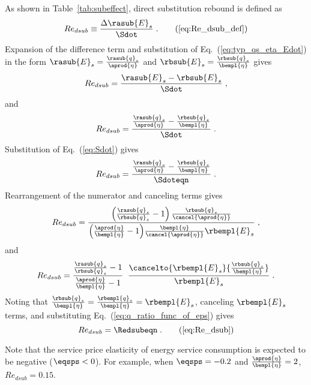 As shown in Table~\ref{tab:subeffect}, direct substitution rebound is defined as
%
\begin{equation}
  Re_{dsub} \equiv \frac{\Delta \rasub{E}_s}{\Sdot} \; . \tag{\ref{eq:Re_dsub_def}}
\end{equation}
%
Expansion of the difference term and
substitution of Eq.~(\ref{eq:typ_qs_eta_Edot}) in the form
$\rasub{E}_s = \frac{\rasub{q}_s}{\aprod{\eta}}$
and
$\rbsub{E}_s = \frac{\rbsub{q}_s}{\bempl{\eta}}$
gives
%
\begin{equation}
   Re_{dsub} = \frac{\rasub{E}_s - \rbsub{E}_s}{\Sdot} \; ,
\end{equation}
%
and
%
\begin{equation}
     Re_{dsub} = \frac{\frac{\rasub{q}_s}{\aprod{\eta}} - \frac{\rbsub{q}_s}{\bempl{\eta}}}{\Sdot} \; .
\end{equation}
%
Substitution of Eq.~(\ref{eq:Sdot}) gives
%
\begin{equation}
  Re_{dsub} = \frac{\frac{\rasub{q}_s}{\aprod{\eta}} - \frac{\rbsub{q}_s}{\bempl{\eta}}}
              {\Sdoteqn} \; .
\end{equation}
%
Rearrangement of the numerator and canceling terms gives
%
\begin{equation}
  Re_{dsub} = \frac{\left( \frac{\rasub{q}_s}{\rbsub{q}_s} - 1 \right) \frac{\rbsub{q}_s}{\cancel{\aprod{\eta}}} }
              {\left( \frac{\aprod{\eta}}{\bempl{\eta}} - 1 \right)\!\frac{\bempl{\eta}}{\cancel{\aprod{\eta}}} \rbempl{E}_s} \; ,
\end{equation}
%
and
%
\begin{equation}
    Re_{dsub} = \frac{\frac{\rasub{q}_s}{\rbsub{q}_s} - 1}{\frac{\aprod{\eta}}{\bempl{\eta}} - 1} \; \;
                \frac{\cancelto{\rbempl{E}_s}{\frac{\rbsub{q}_s}{\bempl{\eta}}}}{\rbempl{E}_s} \; .
\end{equation}
%
Noting that $\frac{\rbsub{q}_s}{\bempl{\eta}} = \frac{\rbempl{q}_s}{\bempl{\eta}} = \rbempl{E}_s$,
canceling $\rbempl{E}_s$ terms,
and substituting Eq.~(\ref{eq:q_ratio_func_of_eps}) gives
%
\begin{equation}
  Re_{dsub} = \Redsubeqn \; . \tag{\ref{eq:Re_dsub}}
\end{equation}

Note that the service price elasticity of energy service consumption is
expected to be negative ($\eqsps < 0$).
For example, when $\eqsps = -0.2$ and $\frac{\aprod{\eta}}{\bempl{\eta}} = 2$,
$Re_{dsub} = 0.15$.

